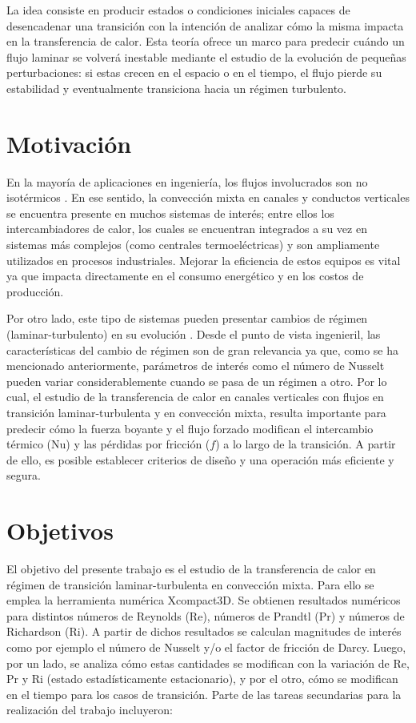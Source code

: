 La idea consiste en producir estados o condiciones iniciales capaces de desencadenar una transición con la intención de analizar cómo la misma impacta en la transferencia de calor. Esta teoría ofrece un marco para predecir cuándo un flujo laminar se volverá inestable mediante el estudio de la evolución de pequeñas perturbaciones: si estas crecen en el espacio o en el tiempo, el flujo pierde su estabilidad y eventualmente transiciona hacia un régimen turbulento.


\section{Motivación}

En la mayoría de aplicaciones en ingeniería, los flujos involucrados son no isotérmicos \cite{chen2003direct}. En ese sentido, la convección mixta en canales y conductos verticales se encuentra presente en muchos sistemas de interés; entre ellos los intercambiadores de calor, los cuales se encuentran integrados a su vez en sistemas más complejos (como centrales termoeléctricas) y son ampliamente utilizados en procesos industriales. Mejorar la eficiencia de estos equipos es vital ya que impacta directamente en el consumo energético y en los costos de producción.

Por otro lado, este tipo de sistemas pueden presentar cambios de régimen (laminar-turbulento) en su evolución \cite{schlatter2005}. Desde el punto de vista ingenieril, las características del cambio de régimen son de gran relevancia ya que, como se ha mencionado anteriormente, parámetros de interés como el número de Nusselt pueden variar considerablemente cuando se pasa de un régimen a otro. Por lo cual, el estudio de la transferencia de calor en canales verticales con flujos en transición laminar-turbulenta y en convección mixta, resulta importante para predecir cómo la fuerza boyante y el flujo forzado modifican el intercambio térmico (Nu) y las pérdidas por fricción ($f$) a lo largo de la transición. A partir de ello, es posible establecer criterios de diseño y una operación más eficiente y segura.




\section{Objetivos}

El objetivo del presente trabajo es el estudio de la transferencia de calor en \linebreak régimen de transición laminar-turbulenta en convección mixta. Para ello se emplea la herramienta numérica Xcompact3D. Se obtienen resultados numéricos para distintos números de Reynolds (Re), números de Prandtl (Pr) y números de Richardson (Ri). A partir de dichos resultados se calculan magnitudes de interés como por ejemplo el número de Nusselt y/o el factor de fricción de Darcy. Luego, por un lado, se analiza cómo estas cantidades se modifican  con la variación de Re, Pr y Ri (estado estadísticamente estacionario), y por el otro, cómo se modifican en el tiempo para los casos de transición. Parte de las tareas secundarias para la realización del trabajo incluyeron:

